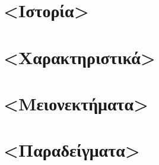     \section{<Ιστορία>}

    \section{<Χαρακτηριστικά>}

    \section{<Μειονεκτήματα>}

    \section{<Παραδείγματα>}
